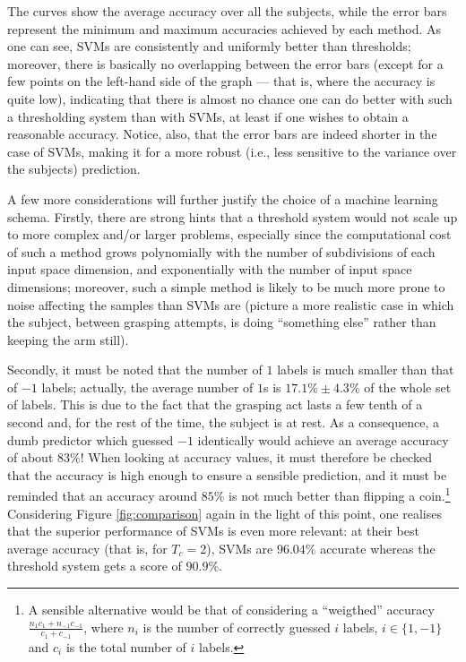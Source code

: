 \documentclass[a4paper,10pt,conference]{ieeeconf}
\begin{document}
The curves show the average accuracy over all the subjects, while the
error bars represent the minimum and maximum accuracies achieved by
each method. As one can see, SVMs are consistently and uniformly
better than thresholds; moreover, there is basically no overlapping
between the error bars (except for a few points on the left-hand side
of the graph --- that is, where the accuracy is quite low), indicating
that there is almost no chance one can do better with such a
thresholding system than with SVMs, at least if one wishes to obtain a
reasonable accuracy. Notice, also, that the error bars are indeed
shorter in the case of SVMs, making it for a more robust (i.e., less
sensitive to the variance over the subjects) prediction.

A few more considerations will further justify the choice of a machine
learning schema. Firstly, there are strong hints that a threshold
system would not scale up to more complex and/or larger problems,
especially since the computational cost of such a method grows
polynomially with the number of subdivisions of each input space
dimension, and exponentially with the number of input space
dimensions; moreover, such a simple method is likely to be much more
prone to noise affecting the samples than SVMs are (picture a more
realistic case in which the subject, between grasping attempts, is doing
``something else'' rather than keeping the arm still).

Secondly, it must be noted that the number of $1$ labels is much
smaller than that of $-1$ labels; actually, the average number of $1$s
is $17.1\% \pm 4.3\%$ of the whole set of labels. This is due to the
fact that the grasping act lasts a few tenth of a second and, for the
rest of the time, the subject is at rest.  As a consequence, a dumb
predictor which guessed $-1$ identically would achieve an average
accuracy of about $83\%$! When looking at accuracy values, it must
therefore be checked that the accuracy is high enough to ensure a
sensible prediction, and it must be reminded that an accuracy around
$85\%$ is not much better than flipping a coin.\footnote{A sensible
alternative would be that of considering a ``weigthed'' accuracy
$\frac{n_1 c_1 + n_{-1} c_{-1}}{c_1+c_{-1}}$, where $n_i$ is the
number of correctly guessed $i$ labels, $i \in \{1,-1\}$ and $c_i$ is
the total number of $i$ labels.} Considering Figure
\ref{fig:comparison} again in the light of this point, one realises
that the superior performance of SVMs is even more relevant: at their
best average accuracy (that is, for $T_c=2$), SVMs are $96.04\%$
accurate whereas the threshold system gets a score of $90.9\%$.
\end{document}
